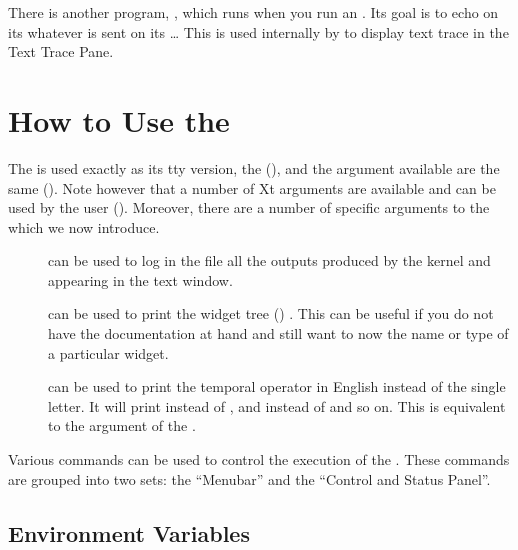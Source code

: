There is another program, , which runs when you run
an \XPK{}. Its goal is to echo on its  whatever is sent on
its \dots{} This is used internally by \XOPRS{} to display text
trace in the Text Trace Pane. 

\chapter{How to Use the \XPK{}}

The \XPK{} is used exactly as its tty version, the \CPK{} (), and the argument available are the same (). Note however that a number of Xt arguments are available
and can be used by the user (). Moreover,
there are a number of specific arguments to the \XPK{} which we now introduce.

\begin{description}

\item[] can be used to log in the file  all
the outputs produced by the kernel and appearing in the text window.

\item[] can be used to print the \XPK{} widget tree () . This can be useful if you do not have the
documentation at hand and still want to now the name or type of a particular
widget.

\item[] can be used to print the temporal operator in English
instead of the single letter. It will print  instead of \samp{!},
and  instead of \samp{\^{}} and so on. This is equivalent to the
 argument of the \CPK{}.

\end{description}

Various commands can be used to control the execution of the \XPK{}.
These commands are grouped into two sets: the ``Menubar'' and the ``Control
and Status Panel''.



\section{\XPK{} Environment Variables}

